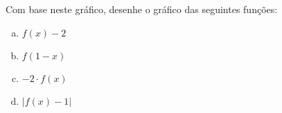 \begin{secExercicios}
\begin{exer}
\begin{center}
\begin{tikzpicture}[scale=0.7]
        
    \end{tikzpicture}
    \end{center}

    Com base neste gráfico, desenhe o gráfico das seguintes funções:
    \begin{enumerate}[a)]
        \item $f(x)-2$
        \item $f(1-x)$
        \item $-2\cdot f(x)$
        \item $|f(x)-1|$
    \end{enumerate}
\end{exer}
    
\end{secExercicios}
 

